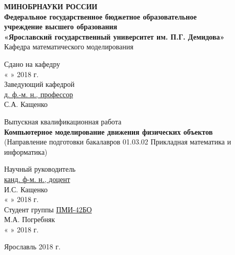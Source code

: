 \documentclass[12pt, a4paper]{extarticle}
\numberwithin{equation}{section}
\begin{document}
\thispagestyle{empty} 
\medskip 

\begin{center} 
	\textbf{МИНОБРНАУКИ РОССИИ\\ 
		\vspace{0.5cm} 
		Федеральное государственное бюджетное образовательное\\ 
		учреждение высшего образования\\ 
		«Ярославский государственный университет им. П.Г. Демидова»}\\ 
	\vspace{0.5cm} 
	{Кафедра математического моделирования}\\ 
	\vspace{1.5cm} 
	
\end{center}
\begin{flushright} 
	Сдано на кафедру\\
	« 
	\underline{\phantom{aaa}} 
	» 
	\underline{\phantom{aaaaaaaaaaaaa}} 2018 г.\\ 
	Заведующий кафедрой\\
	\underline{\phantom{aaa}д. ф.-м. н., профессор\phantom{aaa}}\\ 
	\vspace{0.1cm} 
	\underline{\phantom{aaaaaaaaaaaaa}} С.А. Кащенко
\end{flushright}
\vspace{3cm} 
\begin{center} 
	Выпускная квалификационная работа\\ 
	\vspace{0.5cm} 
	\textbf{Компьютерное моделирование движения физических объектов}\\ 
	\small{(Направление подготовки бакалавров 01.03.02 Прикладная математика и информатика)}
	\vspace{3cm} 
\end{center} 

\begin{flushright} 
	Научный руководитель\\ 
	\underline{\phantom{aaa}канд. ф-м. н., доцент\phantom{aaa}}\\ 
	\vspace{0.1cm} 
	\underline{\phantom{aaaaaaaaaaaaa}} И.С. Кащенко\\ 
	« 
	\underline{\phantom{aaa}} 
	» 
	\underline{\phantom{aaaaaaaaaaaaa}} 2018 г.\\ 
	\vspace{0.5cm} 
	Студент группы \underline{\phantom{a}ПМИ-42БО\phantom{a}}\\ 
	\vspace{0.1cm} 
	\underline{\phantom{aaaaaaaaaaaaa}} М.А. Погребняк\\ 
	« 
	\underline{\phantom{aaa}} 
	» 
	\underline{\phantom{aaaaaaaaaaaaaa}}2018 г.\\ 
	\vspace{1cm} 
\end{flushright} 
\begin{center} 
	Ярославль 2018 г.
	\vspace{-1cm}  
\end{center} 
\end{document}
